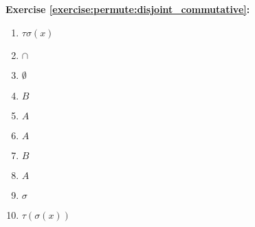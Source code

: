 \noindent\textbf{Exercise \ref{exercise:permute:disjoint_commutative}:}
%
\begin{multicols}{5}
\begin{enumerate}
\item
$\tau\sigma(x)$

\item
%
$\cap$

\item
$\emptyset$

\item
$B$


\item
$A$

\item
$A$

\item
$B$

\item
%
$A$

\item
$\sigma$

\item
$\tau(\sigma(x))$


\end{enumerate}
\end{multicols}
